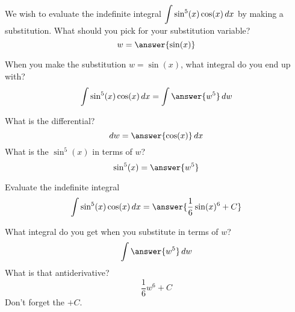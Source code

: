 \documentclass{ximera}
\author{Bobby Ramsey}
\begin{document}
\begin{exercise}

We wish to evaluate the indefinite integral $\displaystyle \int \sin^5(x) \cos(x) \mathop{}\!d x$ by making 
a substitution.  What should you pick for your substitution variable?
	\[ w = \answer{\sin(x)} \]
	\begin{exercise}
		When you make the substitution $w = \sin(x)$, what integral do you end up with?
		\[ \int \sin^5(x) \cos(x) \d x = \int \answer{w^5} \d w \]
		\begin{hint}
			What is the differential?  \[ \d w = \answer{\cos(x) } \d x\]
			What is the $\sin^5(x)$ in terms of $w$? \[\sin^5(x) = \answer{w^5}\]
		\end{hint}
		\begin{exercise}
			Evaluate the indefinite integral
			\[ \int \sin^5(x) \cos(x) \d x = \answer{\frac{1}{6} \sin(x)^6 + C} \]
			\begin{hint}
				What integral do you get when you substitute in terms of $w$?
				\[ \int \answer{w^5} \d w \]
				What is that antiderivative?
				\[ \frac{1}{6} w^6 + C \]
				Don't forget the $+C$.
			\end{hint}
		\end{exercise}
	\end{exercise}
\end{exercise}
\end{document}
